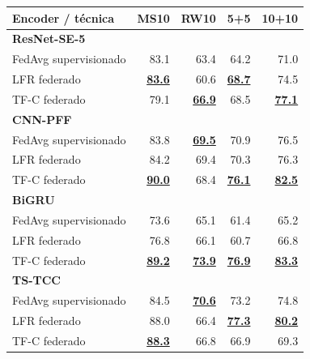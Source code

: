 \begin{tabular}{lrrrr}
\toprule
\textbf{Encoder / técnica} & \textbf{MS10} & \textbf{RW10} & \textbf{5+5} & \textbf{10+10} \\
\midrule
\textbf{ResNet-SE-5} &  &  &  &  \\
\quad FedAvg supervisionado & 83.1 & 63.4 & 64.2 & 71.0 \\
\quad LFR federado & \underline{\textbf{83.6}} & 60.6 & \underline{\textbf{68.7}} & 74.5 \\
\quad TF-C federado & 79.1 & \underline{\textbf{66.9}} & 68.5 & \underline{\textbf{77.1}} \\
\textbf{CNN-PFF} &  &  &  &  \\
\quad FedAvg supervisionado & 83.8 & \underline{\textbf{69.5}} & 70.9 & 76.5 \\
\quad LFR federado & 84.2 & 69.4 & 70.3 & 76.3 \\
\quad TF-C federado & \underline{\textbf{90.0}} & 68.4 & \underline{\textbf{76.1}} & \underline{\textbf{82.5}} \\
\textbf{BiGRU} &  &  &  &  \\
\quad FedAvg supervisionado & 73.6 & 65.1 & 61.4 & 65.2 \\
\quad LFR federado & 76.8 & 66.1 & 60.7 & 66.8 \\
\quad TF-C federado & \underline{\textbf{89.2}} & \underline{\textbf{73.9}} & \underline{\textbf{76.9}} & \underline{\textbf{83.3}} \\
\textbf{TS-TCC} &  &  &  &  \\
\quad FedAvg supervisionado & 84.5 & \underline{\textbf{70.6}} & 73.2 & 74.8 \\
\quad LFR federado & 88.0 & 66.4 & \underline{\textbf{77.3}} & \underline{\textbf{80.2}} \\
\quad TF-C federado & \underline{\textbf{88.3}} & 66.8 & 66.9 & 69.3 \\
\bottomrule
\end{tabular}
